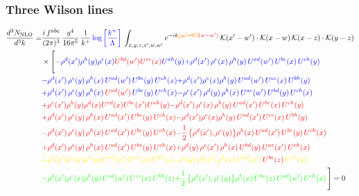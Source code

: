 \documentclass[9pt]{article}
\numberwithin{equation}{section}
\begin{document}
\subsubsection{Three Wilson lines}
\begin{align}
\frac{d^{3}N_{\rm NLO}}{d^{3}k}= &\frac{i\,f^{abc}}{(2\pi)^{3}}\,\frac{g^{4}}{16\pi^{5}}\,\frac{1}{k^{+}}\,{\color{blue}\log{\left[\frac{k^{+}}{\Lambda}\right]}}\,\int_{x,y,z,x',w,w'}e^{-ik{\color{orange}\cancel{(w'-w)}}{\color{red}(w-w')}}\,\mathcal{K}(x'-w')\cdot\mathcal{K}(x-w)\,\mathcal{K}(x-z)\cdot\mathcal{K}(y-z)\notag\\
&\times\Bigg[{\color{blue}-\rho^{d}(x') \rho^{h}(y) \rho^{e}(x) {\color{red}U^{bd}(w')} {\color{red}U^{ce}(x)} U^{a h}(y)} {\color{blue}+\rho^{d}(x')\,\rho^{e}(x)\,\rho^{h}(y)\,U^{ad}(w')\,U^{be}(x)\,U^{ch}(y)} \notag \\ &{\color{blue}-\rho^{d}(x')\,\rho^{e}(y)\,\rho^{h}(x)\,U^{ad}(w')\,U^{be}(y)\,U^{ch}(x)}{\color{blue}+\rho^{d}(x')\rho^{e}(x)\rho^{h}(y)\, U^{ad}(w')\,U^{ce}(x)\, U^{bh}(y)}\notag \\ &{\color{blue}+\rho^{d}(x')\, \rho^{e}(y)\,\rho^{h}(x)\, {\color{red}U^{ad}(w')}\,U^{be}(y)\,U^{ch}(x)}{\color{blue}-\rho^{e}(x')\,\rho^{d}(y)\,\rho^{h}(x)\,U^{ae}(w')\,U^{bd}(y)\,U^{ch}(x)}\notag \\ &{\color{red}+\rho^{e}(x') \rho^{h}(y) \rho^{d}(x) {\color{red}U^{cd}(x)} U^{b e}(x') U^{a h}(y)}{\color{red}-\rho^{d}(x')\,\rho^{e}(x)\,\rho^{h}(y)\,U^{ad}(x')\,U^{be}(x)\,U^{ch}(y)}\notag \\ &{\color{red}+\rho^{d}(x')\,\rho^{e}(y)\,\rho^{h}(x)\,U^{ad}(x')\,U^{be}(y)\,U^{ch}(x)}{\color{red}-\rho^{d}(x')\rho^{e}(x)\rho^{h}(y)\, U^{ad}(x')\,U^{ce}(x)\, U^{bh}(y)}\notag \\ &{\color{red}-\rho^{d}(x')\, \rho^{e}(y)\,\rho^{h}(x)\, {\color{red}U^{ad}(x')}\,U^{be}(y)\,U^{ch}(x)}{\color{red}-\frac{1}{2}\,\big\{\rho^{d}(x'),\rho^{e}(y)\big\}\rho^{h}(x)\,U^{ad}(x')\,U^{be}(y)\,U^{ch}(x)}\notag \\ & {\color{red}+\rho^{d}(x')\,\rho^{e}(y)\,\rho^{h}(x)\,U^{ad}(x')\,U^{be}(y)\,U^{ch}(x)}{\color{red}+\rho^{d}(y)\,\rho^{e}(x')\,\rho^{h}(x)\,U^{bd}(y)\,U^{ae}(x')\,U^{ch}(x)}\notag \\ & {\color{yellow}+\rho^{d}(x')\rho^{e}(x)\rho^{h}(y)\, U^{ad}(x')\,U^{ce}(x)\, U^{bh}(z)}{\color{yellow}-\rho^{e}(y)\,\rho^{d}(x')\,\rho^{h}(x)\,U^{ad}(x')\,{\color{red}U^{be}(z)}\,U^{ch}(x)}\notag \\
&{\color{green}-\rho^{d}(x')\rho^{e}(x)\rho^{h}(y)\, U^{ad}(w')\,U^{ce}(x)\, U^{bh}(z)}{\color{green}+\frac{1}{2}\,\big\{\rho^{d}(x'),\rho^{e}(y)\big\}\rho^{h}(x)\,U ^{be}(z)\,U^{ad}(w')\,U^{ch}(x)}\,\Bigg] = 0 
\end{align}
\end{document}
